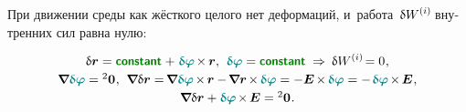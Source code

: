 \begin{otherlanguage}{russian}
\vspace{-0.1em}
При движении среды как жёсткого целого нет деформаций, и~работа~$\variation{\internalwork}\hspace{-0.2ex}$ внутренних сил равна нулю:

\nopagebreak\vspace{-0.1em}\begin{equation*}
\begin{array}{c}
\variation{\currentlocationvector}
= \boldconstant \hspace{.1ex}
+ \hspace{.1ex} \littlerotationvector \hspace{-0.2ex} \times \hspace{-0.12ex} \locationvector ,
\:\,
\littlerotationvector = \boldconstant
\hspace{.64ex}\Rightarrow\hspace{.5ex}
\variation{\internalwork} \hspace{-0.2ex}
= 0 \hspace{.1ex} ,
\\[.25em]
%
\boldnabla \littlerotationvector
= {^2\bm{0}}
\hspace{.1ex} ,
\:\,
\boldnabla \variation{\currentlocationvector}
= \hspace{-0.25ex} \boldnabla \littlerotationvector %
\hspace{-0.2ex} \times \hspace{-0.2ex} \locationvector
- \hspace{-0.25ex} \boldnabla \locationvector \hspace{-0.2ex} \times \hspace{-0.2ex} \littlerotationvector
= - \UnitDyad \hspace{-0.2ex} \times \hspace{-0.2ex} \littlerotationvector
= - \hspace{.2ex} \littlerotationvector \hspace{-0.2ex} \times \hspace{-0.2ex} \UnitDyad
\hspace{.1ex} ,
\\[.25em]
%
\boldnabla \variation{\currentlocationvector}
+ \littlerotationvector \hspace{-0.2ex} \times \hspace{-0.2ex} \UnitDyad
= {^2\bm{0}}
\hspace{.1ex} .
\end{array}
\end{equation*}


\end{otherlanguage}
